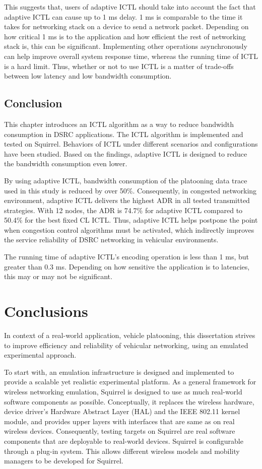 \documentclass[12pt]{report}
\begin{document}
This suggests that, users of adaptive ICTL should take into account the fact that adaptive ICTL can cause up to 1 ms delay. 1 ms is comparable to the time it takes for networking stack on a device to send a network packet. Depending on how critical 1 ms is to the application and how efficient the rest of networking stack is, this can be significant. Implementing other operations asynchronously can help improve overall system response time, whereas the running time of ICTL is a hard limit. Thus, whether or not to use ICTL is a matter of trade-offs between low latency and low bandwidth consumption.

\section{Conclusion}

This chapter introduces an ICTL algorithm as a way to reduce bandwidth consumption in DSRC applications. The ICTL algorithm is implemented and tested on Squirrel. Behaviors of ICTL under different scenarios and configurations have been studied. Based on the findings, adaptive ICTL is designed to reduce the bandwidth consumption even lower.

By using adaptive ICTL, bandwidth consumption of the platooning data trace used in this study is reduced by over 50\%. Consequently, in congested networking environment, adaptive ICTL delivers the highest ADR in all tested transmitted strategies. With 12 nodes, the ADR is 74.7\% for adaptive ICTL compared to 50.4\% for the best fixed CL ICTL. Thus, adaptive ICTL helps postpone the point when congestion control algorithms must be activated, which indirectly improves the service reliability of DSRC networking in vehicular environments.

The running time of adaptive ICTL's encoding operation is less than 1 ms, but greater than 0.3 ms. Depending on how sensitive the application is to latencies, this may or may not be significant.

\chapter{Conclusions}

In context of a real-world application, vehicle platooning, this dissertation strives to improve efficiency and reliability of vehicular networking, using an emulated experimental approach.

To start with, an emulation infrastructure is designed and implemented to provide a scalable yet realistic experimental platform. As a general framework for wireless networking emulation, Squirrel is designed to use as much real-world software components as possible. Conceptually, it replaces the wireless hardware, device driver's Hardware Abstract Layer (HAL) and the IEEE 802.11 kernel module, and provides upper layers with interfaces that are same as on real wireless devices. Consequently, testing targets on Squirrel are real software components that are deployable to real-world devices. Squirrel is configurable through a plug-in system. This allows different wireless models and mobility managers to be developed for Squirrel.
\end{document}
